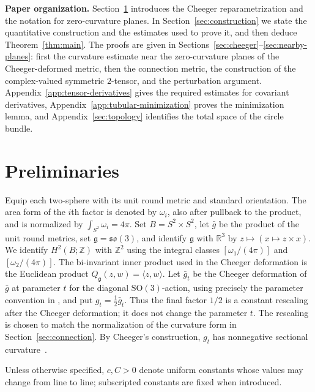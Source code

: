 \documentclass[11pt]{article}
\theoremstyle{definition}
\theoremstyle{remark}
\newcommand{\R}{\mathbb R}
\newcommand{\Z}{\mathbb Z}
\begin{document}
\vspace{3pt}

\noindent\textbf{Paper organization.}
Section~\ref{sec:preliminaries} introduces the
Cheeger reparametrization and the notation for zero-curvature planes.  In
Section~\ref{sec:construction} we state the quantitative construction and
the estimates used to prove it, and then deduce Theorem~\ref{thm:main}.  The
proofs are
given in Sections~\ref{sec:cheeger}--\ref{sec:nearby-planes}: first the
curvature estimate near the zero-curvature planes of the Cheeger-deformed
metric, then the connection metric, the construction of the complex-valued
symmetric $2$-tensor, and the perturbation argument.
Appendix~\ref{app:tensor-derivatives} gives the required estimates for
covariant derivatives, Appendix~\ref{app:tubular-minimization} proves the minimization
lemma, and Appendix~\ref{sec:topology} identifies the total space of the
circle bundle.

\section{Preliminaries}                                               \label{sec:preliminaries}

Equip each two-sphere with its unit round metric and standard orientation.
The area form of the $i$th factor is denoted by $\omega_i$, also after
pullback to the product, and is normalized by
$\int_{S^2}\omega_i=4\pi$.  Set $B=S^2\times S^2$, let $\bar g$ be the
product of the unit round metrics, set $\mathfrak g=\mathfrak{so}(3)$, and identify
$\mathfrak g$ with $\R^3$ by $z\mapsto(x\mapsto z\times x)$.
We identify $H^2(B;\Z)$ with $\Z^2$ using the integral classes
$[\omega_1/(4\pi)]$ and $[\omega_2/(4\pi)]$.
The bi-invariant inner product used in the
Cheeger deformation is the Euclidean product
$Q_{\mathfrak g}(z,w)=\langle z,w\rangle$.  Let $\bar g_t$ be the Cheeger
deformation of $\bar g$ at parameter $t$ for the diagonal
$\mathrm{SO}(3)$-action, using precisely the parameter convention in
\cite[Proposition~1.3]{Ziller2009}, and put
$g_t=\tfrac12\bar g_t$.  Thus the
final factor $1/2$ is a constant rescaling after the Cheeger deformation; it
does not change the parameter $t$.  The rescaling is chosen to match the
normalization of the curvature form in Section~\ref{sec:connection}.  By
Cheeger's construction, $g_t$ has
nonnegative sectional curvature~\cite{Cheeger1973}.

Unless otherwise specified, $c,C>0$ denote uniform constants whose values
may change from line to line; subscripted constants are fixed when introduced.
\end{document}
